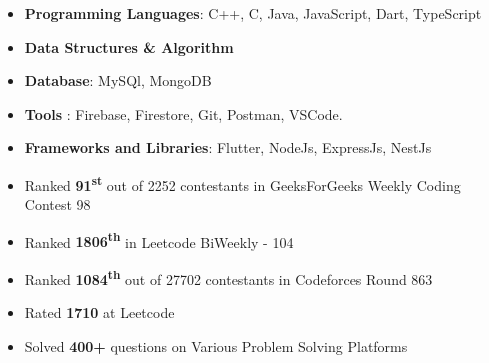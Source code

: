 \documentclass[10pt,a4paper,ragged2e,withhyper]{altacv}
\begin{document}
\begin{paracol}{2}
\switchcolumn


\begin{itemize}
    \item \textbf{\color{accent!90!black}Programming Languages}: C++, C, Java, JavaScript, Dart, TypeScript
    \item \textbf{\color{accent!90!black}Data Structures \& Algorithm}
    \item \textbf{\color{accent!90!black}Database}: MySQl, MongoDB
     \item \textbf{\color{accent!90!black}Tools} : Firebase, Firestore, Git, Postman, VSCode.
    \item \textbf{\color{accent!90!black}Frameworks and Libraries}: Flutter, NodeJs, ExpressJs, NestJs
\end{itemize}

\begin{itemize}
\item Ranked \textbf{\color{accent!90!black} 91\textsuperscript{st}} out of 2252 contestants in GeeksForGeeks Weekly Coding Contest 98
\end{itemize}

\begin{itemize}
\item Ranked \textbf{\color{accent!90!black}1806\textsuperscript{th}} in Leetcode BiWeekly - 104
\end{itemize}

\begin{itemize}
\item Ranked \textbf{\color{accent!90!black}1084\textsuperscript{th}} out of 27702 contestants in Codeforces Round 863
\end{itemize}

\begin{itemize}
\item Rated \textbf{\color{accent!90!black}1710} at Leetcode
\end{itemize}

\begin{itemize}
\item Solved \textbf{\color{accent!90!black}400+} questions on Various Problem Solving Platforms
\end{itemize}


\end{paracol}
\end{document}
